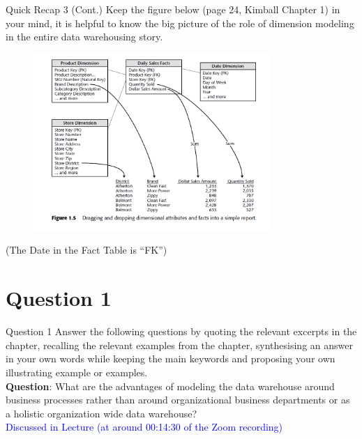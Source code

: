 \begin{frame}[fragile]{Quick Recap 3 (Cont.)}
Keep the figure below (page 24, Kimball Chapter 1) in your mind, it is helpful to know the big picture of the role of dimension modeling in the entire data warehousing story.\\
\begin{figure}
	\includegraphics[width=0.8\textwidth, trim=0 0 0 0, clip]{t9/images/design.png}
\end{figure}	
\vspace{-25pt}
\begin{center}
	{\tiny (The Date in the Fact Table is ``FK'')}
\end{center}
\vspace{-8pt}
\end{frame}

\section*{Question 1}

\begin{frame}[fragile]{Question 1}
Answer the following questions by quoting the relevant excerpts in the chapter, recalling the relevant examples from the chapter, synthesising an answer in your own words while keeping the main keywords and proposing your own illustrating example or examples.\\\vspace{10pt}
\textbf{Question}: What are the advantages of modeling the data warehouse around business processes rather than around organizational business departments or as a holistic organization wide data warehouse?\\
\vspace{10pt}
\textcolor{blue}{Discussed in Lecture (at around 00:14:30 of the Zoom recording)}
\end{frame}

